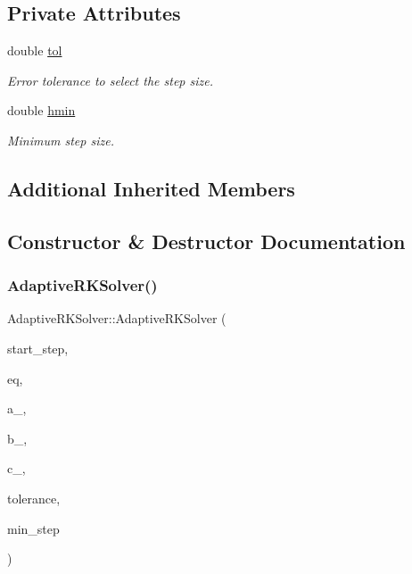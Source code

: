 \subsection*{Private Attributes}
\begin{DoxyCompactItemize}
\item 
double \hyperlink{classAdaptiveRKSolver_afc9af0ecd74d4b9a02a6ae5160949d86}{tol}
\begin{DoxyCompactList}\small\item\em Error tolerance to select the step size. \end{DoxyCompactList}\item 
double \hyperlink{classAdaptiveRKSolver_a771a7c6efdafb13b75ac1f96ef484f46}{hmin}
\begin{DoxyCompactList}\small\item\em Minimum step size. \end{DoxyCompactList}\end{DoxyCompactItemize}
\subsection*{Additional Inherited Members}


\subsection{Constructor \& Destructor Documentation}
\mbox{\label{classAdaptiveRKSolver_af3fd0e899dbda2be0ff705f8d8ea7a08}} 
\subsubsection{\texorpdfstring{Adaptive\+R\+K\+Solver()}{AdaptiveRKSolver()}\hspace{0.1cm}{\footnotesize\ttfamily [1/2]}}
{\footnotesize\ttfamily Adaptive\+R\+K\+Solver\+::\+Adaptive\+R\+K\+Solver (\begin{DoxyParamCaption}\item[{double}]{start\+\_\+step,  }\item[{const \hyperlink{classBaseEquation}{Base\+Equation} \&}]{eq,  }\item[{const std\+::vector$<$ std\+::vector$<$ double $>$$>$ \&}]{a\+\_\+,  }\item[{const std\+::vector$<$ double $>$ \&}]{b\+\_\+,  }\item[{const std\+::vector$<$ double $>$ \&}]{c\+\_\+,  }\item[{double}]{tolerance,  }\item[{double}]{min\+\_\+step }\end{DoxyParamCaption})\hspace{0.3cm}{\ttfamily [inline]}}

